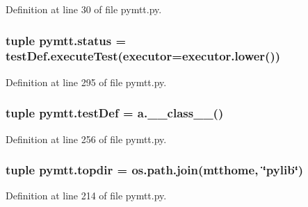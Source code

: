 Definition at line 30 of file pymtt.\-py.

\hypertarget{namespacepymtt_a1a2fd13626c1c2d248cedc138e8660ec}{
\subsubsection[{status}]{\setlength{\rightskip}{0pt plus 5cm}tuple pymtt.\-status = test\-Def.\-execute\-Test({\bf executor}=executor.\-lower())}}\label{namespacepymtt_a1a2fd13626c1c2d248cedc138e8660ec}


Definition at line 295 of file pymtt.\-py.

\hypertarget{namespacepymtt_afebe539e6104da8ebd3d06b7a0e77fe7}{
\subsubsection[{test\-Def}]{\setlength{\rightskip}{0pt plus 5cm}tuple pymtt.\-test\-Def = a.\-\_\-\-\_\-class\-\_\-\-\_\-()}}\label{namespacepymtt_afebe539e6104da8ebd3d06b7a0e77fe7}


Definition at line 256 of file pymtt.\-py.

\hypertarget{namespacepymtt_ac673c895b8c93a029d2a1655c04af315}{
\subsubsection[{topdir}]{\setlength{\rightskip}{0pt plus 5cm}tuple pymtt.\-topdir = os.\-path.\-join({\bf mtthome}, \char`\"{}pylib\char`\"{})}}\label{namespacepymtt_ac673c895b8c93a029d2a1655c04af315}


Definition at line 214 of file pymtt.\-py.

